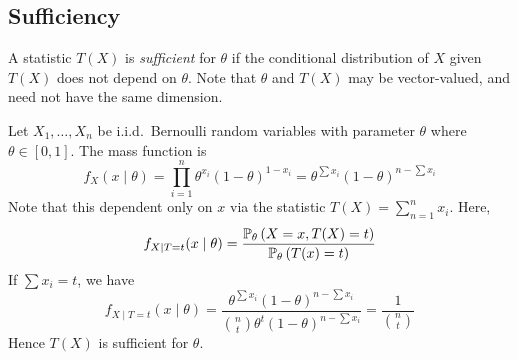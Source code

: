 \subsection{Sufficiency}
\begin{definition}
	A statistic \( T(X) \) is \textit{sufficient} for \( \theta \) if the conditional distribution of \( X \) given \( T(X) \) does not depend on \( \theta \).
	Note that \( \theta \) and \( T(X) \) may be vector-valued, and need not have the same dimension.
\end{definition}
\begin{example}
	Let \( X_1, \dots, X_n \) be i.i.d.\ Bernoulli random variables with parameter \( \theta \) where \( \theta \in [0,1] \).
	The mass function is
	\[
		f_X(x \mid \theta) = \prod_{i=1}^n \theta^{x_i}(1-\theta)^{1-x_i} = \theta^{\sum x_i} (1-\theta)^{n - \sum x_i}
	\]
	Note that this dependent only on \( x \) via the statistic \( T(X) = \sum_{n=1}^n x_i \).
	Here,
	\[
		f_{X \mid T = t}(x \mid \theta) = \frac{\mathbb{P}_{\theta}\left({X = x, T(X) = t}\right)}{\mathbb{P}_{\theta}\left({T(x) = t}\right)}
	\]
	If \( \sum x_i = t \), we have
	\[
		f_{X \mid T = t}(x \mid \theta) = \frac{\theta^{\sum x_i} (1-\theta)^{n-\sum x_i}}{\binom{n}{t} \theta^t (1-\theta)^{n-\sum x_i}} = \frac{1}{\binom{n}{t}}
	\]
	Hence \( T(X) \) is sufficient for \( \theta \).
\end{example}

